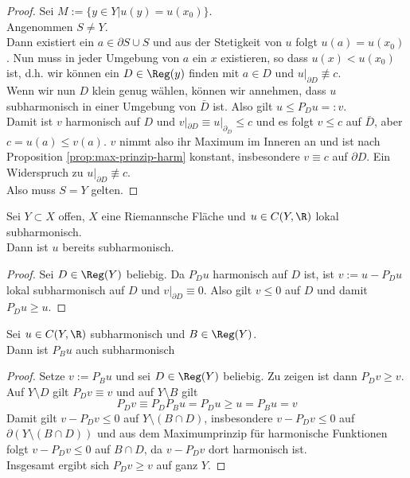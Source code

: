\begin{proof}
  Sei $M:= \{y \in Y | u(y) = u(x_0) \}$. \\
  Angenommen $S \neq Y$. \\
  Dann existiert ein $a \in \partial S \cup S$ und aus der Stetigkeit
  von $u$ folgt $u(a) = u(x_0)$. Nun muss in jeder Umgebung von $a$
  ein $x$ existieren, so dass $u(x) < u(x_0)$ ist, d.h. wir können ein
  $D \in \Reg(y)$ finden mit $a \in D$ und $u|_{\partial D} \not
  \equiv c$. \\
  Wenn wir nun $D$ klein genug wählen, können wir annehmen, dass $u$
  subharmonisch in einer Umgebung von $\bar D$ ist. Also gilt $u \leq
  P_D u =: v$. \\
  Damit ist $v$ harmonisch auf $D$ und $v|_{\partial D} \equiv
  u|_{\partial_D} \leq c$ und es folgt $v \leq c$ auf $\bar D$, aber
  $c = u(a) \leq v(a)$. $v$ nimmt also ihr Maximum im Inneren an und
  ist nach Proposition \ref{prop:max-prinzip-harm} konstant,
  insbesondere $v \equiv c$ auf $\partial D$. Ein Widerspruch zu
  $u|_{\partial D} \not \equiv c$. \\
  Also muss $S = Y$ gelten.
\end{proof}

\begin{cor}
  Sei $Y\subset X$ offen, $X$ eine Riemannsche Fläche und $u \in C(Y,
  \R)$ lokal subharmonisch. \\
  Dann ist $u$ bereits subharmonisch.
\end{cor}

\begin{proof}
  Sei $D \in \Reg(Y)$ beliebig. Da $P_D u$ harmonisch auf $D$ ist, ist
  $v:= u- P_Du$ lokal subharmonisch auf $D$ und $v|_{\partial D}
  \equiv 0$. Also gilt $v \leq0$ auf $D$ und damit $P_Du \geq u$.
\end{proof}

\begin{lemma}
  Sei $u \in C(Y, \R)$ subharmonisch und $B \in \Reg(Y)$.\\
  Dann ist $P_B u$ auch subharmonisch
\end{lemma}

\begin{proof}
  Setze $v:= P_B u$ und sei $D \in \Reg(Y)$ beliebig. Zu zeigen ist
  dann $P_D v \geq v$. \\
  Auf $Y \setminus D$ gilt $P_Dv \equiv v$ und auf $Y\setminus B$ gilt
  \[
  P_Dv \equiv P_DP_Bu = P_Du \geq u = P_Bu = v
  \]
  Damit gilt $v - P_Dv \leq 0$ auf $Y \setminus (B \cap D)$,
  insbesondere $v- P_D v \leq 0$ auf $\partial (Y \setminus (B \cap
  D))$ und aus dem Maximumprinzip für harmonische Funktionen folgt $v
  - P_D v \leq 0$ auf $B \cap D$, da $v - P_D v$ dort harmonisch
  ist.\\
  Insgesamt ergibt sich $P_Dv \geq v$ auf ganz $Y$.
\end{proof}

